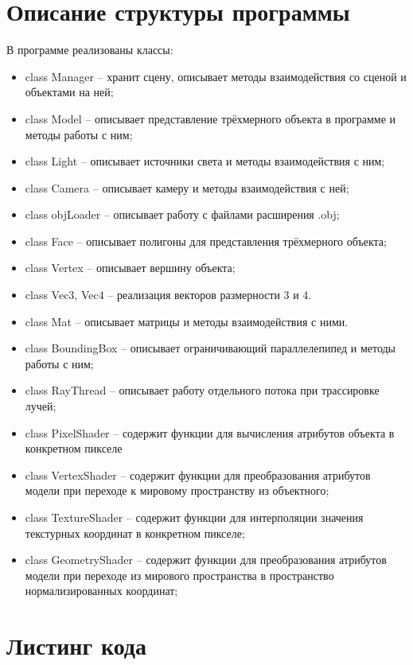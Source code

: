 \section{Описание структуры программы}
В программе реализованы классы:
\begin{itemize}
	\item class Manager – хранит сцену, описывает методы взаимодействия со сценой и объектами на ней;
	\item class Model – описывает представление трёхмерного объекта в программе и методы работы с ним;
	\item class Light – описывает источники света и методы взаимодействия с ним;
	\item class Camera – описывает камеру и методы взаимодействия с ней;
	\item class objLoader – описывает работу с файлами расширения .obj;
	\item class Face – описывает полигоны для представления трёхмерного объекта;
	\item class Vertex – описывает вершину объекта;
	\item class Vec3, Vec4 – реализация векторов размерности 3 и 4.
	\item class Mat – описывает матрицы и методы взаимодействия с ними.
	\item class BoundingBox – описывает ограничивающий параллелепипед и методы работы с ним;
	\item class RayThread – описывает работу отдельного потока при трассировке лучей;
	\item class PixelShader – содержит функции для вычисления атрибутов объекта в конкретном пикселе
	\item class VertexShader – содержит функции для преобразования атрибутов модели при переходе к мировому пространству из объектного;
	\item class TextureShader – содержит функции для интерполяции значения текстурных координат в конкретном пикселе;
	\item class GeometryShader – содержит функции для преобразования атрибутов модели при переходе из мирового пространства в пространство нормализированных координат;
\end{itemize}
\section{Листинг кода}

